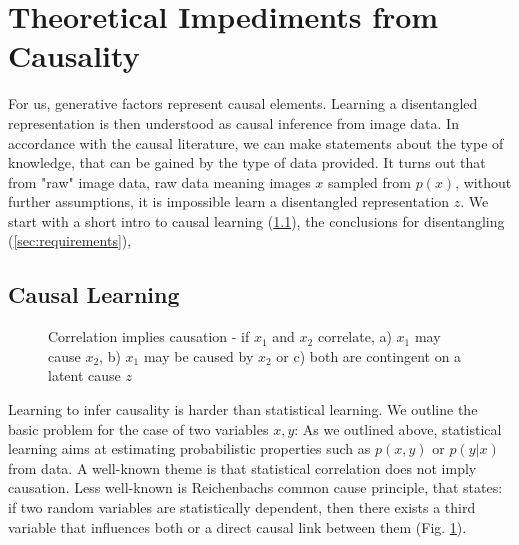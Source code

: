 \section{Theoretical Impediments from Causality}\label{sec:causality}
	For us, generative factors represent causal elements.
	Learning a disentangled representation is then understood as causal inference from image data.
	In accordance with the causal literature, we can make statements about the type of knowledge, that can be gained by the type of data provided. It turns out that from "raw" image data, raw data meaning images $x$ sampled from $p(x)$, without further assumptions, it is impossible learn a disentangled representation $z$. We start with a short intro to causal learning (\ref{sec:causallearning}), the conclusions for disentangling (\ref{sec:requirements}),

	\subsection{Causal Learning}\label{sec:causallearning}
		\begin{figure}[t]
			\begin{subfigure}{0.3\linewidth}
				\centering
				
				\caption{}
			\end{subfigure}
			\begin{subfigure}{0.3\linewidth}
				\centering
				
				\caption{}
			\end{subfigure}
			\begin{subfigure}{0.3\linewidth}
				\centering
				
				\caption{}
			\end{subfigure}
			\caption{Correlation implies causation - if $x_1$ and $x_2$ correlate, a) $x_1$ may cause $x_2$,  b) $x_1$ may be caused by $x_2$ or c) both are contingent on a latent cause $z$}
			\label{fig:reichenbach}
		\end{figure}

		Learning to infer causality is harder than statistical learning. We outline the basic problem for the case of two variables $x, y$: As we outlined above, statistical learning aims at estimating probabilistic properties such as $p(x, y)$ or  $p(y|x)$ from data.
		A well-known theme is that statistical correlation does not imply causation. Less well-known is Reichenbachs common cause principle, that states: if two random variables are statistically dependent, then there exists a third variable that influences both or a direct causal link between them (Fig. \ref{fig:reichenbach}).

